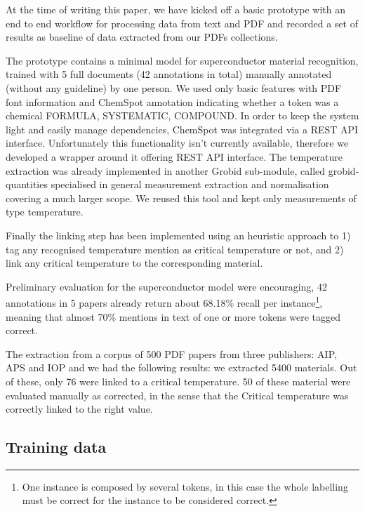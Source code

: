 \documentclass{article}
\begin{document}
At the time of writing this paper, we have kicked off a basic prototype with an end to end workflow for processing data from text and PDF and recorded a set of results as baseline of data extracted from our PDFs collections. 

The prototype contains a minimal model for superconductor material recognition, trained with 5 full documents (42 annotations in total) manually annotated (without any guideline) by one person. We used only basic features with PDF font information and ChemSpot \cite{10.1093/bioinformatics/bts183} annotation indicating whether a token was a chemical FORMULA, SYSTEMATIC, COMPOUND. In order to keep the system light and easily manage dependencies, ChemSpot was integrated via a REST API interface. Unfortunately this functionality isn't currently available, therefore we developed a wrapper around it offering REST API \cite{chemspot-web} interface.    
The temperature extraction was already implemented in another Grobid sub-module, called grobid-quantities\cite{grobid-quantities} specialised in general measurement extraction and normalisation covering a much larger scope. We reused this tool and kept only measurements of type temperature. 

Finally the linking step has been implemented using an heuristic approach to 1) tag any recognised temperature mention as critical temperature or not, and 2) link any critical temperature to the corresponding material. 

Preliminary evaluation for the superconductor model were encouraging, 42 annotations in 5 papers already return about 68.18\% recall per instance\footnote{One instance is composed by several tokens, in this case the whole labelling must be correct for the instance to be considered correct.}, meaning that almost 70\% mentions in text of one or more tokens were tagged correct. 

The extraction from a corpus of 500 PDF papers from three publishers: AIP, APS and IOP and we had the following results: we extracted 5400 materials. 
Out of these, only 76 were linked to a critical temperature. 50 of these material were evaluated manually as corrected, in the sense that the Critical temperature was correctly linked to the right value. 

\subsection{Training data}
\label{sec:training-data}
\end{document}
